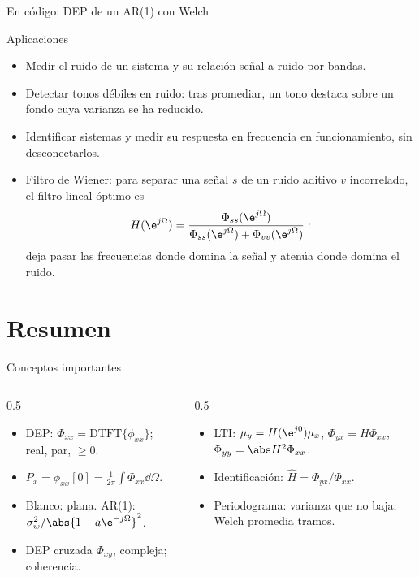 \documentclass[aspectratio=169,11pt]{beamer}
\begin{document}
\begin{frame}{En código: DEP de un AR(1) con Welch}
\end{frame}

\begin{frame}{Aplicaciones}
  \begin{itemize}
    \item \alert{Medir el ruido} de un sistema y su relación señal a ruido por bandas.
    \item \alert{Detectar tonos} débiles en ruido: tras promediar, un tono destaca sobre un fondo cuya varianza se ha reducido.
    \item \alert{Identificar sistemas} y medir su respuesta en frecuencia en funcionamiento, sin desconectarlos.
    \item \alert{Filtro de Wiener}: para separar una señal $s$ de un ruido aditivo $v$ incorrelado, el filtro lineal óptimo es
    \[
      H(\e^{j\Omega})=\frac{\Phi_{ss}(\e^{j\Omega})}{\Phi_{ss}(\e^{j\Omega})+\Phi_{vv}(\e^{j\Omega})}:
    \]
    deja pasar las frecuencias donde domina la señal y atenúa donde domina el ruido.
  \end{itemize}
\end{frame}

\section*{Resumen}
\begin{frame}{Conceptos importantes}
  \begin{columns}[T]
    \begin{column}{0.5\textwidth}
      \begin{itemize}
        \item DEP: $\Phi_{xx}=\text{DTFT}\{\phi_{xx}\}$; real, par, $\ge0$.
        \item $P_x=\phi_{xx}[0]=\frac1{2\pi}\int\Phi_{xx}\dd\Omega$.
        \item Blanco: plana. AR(1): $\sigma_w^2/\abs{1-a\e^{-j\Omega}}^2$.
        \item DEP cruzada $\Phi_{xy}$, compleja; coherencia.
      \end{itemize}
    \end{column}
    \begin{column}{0.5\textwidth}
      \begin{itemize}
        \item LTI: $\mu_y=H(\e^{j0})\mu_x$, $\Phi_{yx}=H\Phi_{xx}$, $\Phi_{yy}=\abs H^2\Phi_{xx}$.
        \item Identificación: $\hat H=\Phi_{yx}/\Phi_{xx}$.
        \item Periodograma: varianza que no baja; Welch promedia tramos.
      \end{itemize}
    \end{column}
  \end{columns}
  \bigskip
\end{frame}
\end{document}
